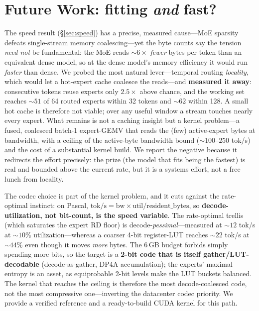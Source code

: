 \documentclass[10pt]{article}
\begin{document}
\section{Future Work: fitting \emph{and} fast?}\label{sec:future}
The speed result (\S\ref{sec:speed}) has a precise, measured cause---MoE sparsity defeats single-stream
memory coalescing---yet the byte counts say the tension \emph{need not} be fundamental: the MoE reads
${\sim}6\times$ \emph{fewer} bytes per token than an equivalent dense model, so at the dense model's
memory efficiency it would run \emph{faster} than dense. We probed the most natural lever---temporal
routing \emph{locality}, which would let a hot-expert cache coalesce the reads---and \textbf{measured it
away}: consecutive tokens reuse experts only $2.5\times$ above chance, and the working set reaches ${\sim}51$
of 64 routed experts within 32 tokens and ${\sim}62$ within 128. A small hot cache is therefore not
viable; over any useful window a stream touches nearly every expert. What remains is not a caching
insight but a kernel problem---a fused, coalesced batch-1 expert-GEMV that reads the (few) active-expert
bytes at bandwidth, with a ceiling of the active-byte bandwidth bound (${\sim}100$--$250$ tok/s) and the
cost of a substantial kernel build. We report the negative because it redirects the effort precisely: the
prize (the model that fits being the fastest) is real and bounded above the current rate, but it is a
systems effort, not a free lunch from locality.

The codec choice is part of the kernel problem, and it cuts against the rate-optimal instinct: on Pascal,
$\textrm{tok/s} = \textrm{bw}\times\textrm{util}/\textrm{resident\_bytes}$, so \textbf{decode-utilization,
not bit-count, is the speed variable}. The rate-optimal trellis (which saturates the expert RD floor) is
decode-\emph{pessimal}---measured at ${\sim}12$ tok/s at ${\sim}10\%$ utilization---whereas a coarser 4-bit
register-LUT reaches ${\sim}22$ tok/s at ${\sim}44\%$ even though it moves \emph{more} bytes. The 6\,GB
budget forbids simply spending more bits, so the target is a \textbf{2-bit code that is itself
gather/LUT-decodable} (decode-as-gather, DP4A accumulation); the experts' maximal entropy is an asset, as
equiprobable 2-bit levels make the LUT buckets balanced. The kernel that reaches the ceiling is therefore
the most decode-coalesced code, not the most compressive one---inverting the datacenter codec priority. We
provide a verified reference and a ready-to-build CUDA kernel for this path.
\end{document}
